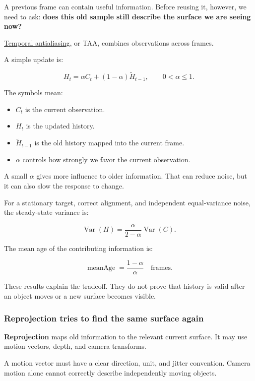 A previous frame can contain useful information. Before reusing it, however, we need to ask: \textbf{does this old sample still describe the surface we are seeing now?}

\hyperref[appendix-0727340a4428]{Temporal antialiasing}, or TAA, combines observations across frames.

A simple update is:

\[
H_t=\alpha C_t+(1-\alpha)\widetilde H_{t-1},
\qquad 0<\alpha\leq1.
\]

The symbols mean:

\begin{itemize}
\tightlist
\item
  \(C_t\) is the current observation.
\item
  \(H_t\) is the updated history.
\item
  \(\widetilde H_{t-1}\) is the old history mapped into the current frame.
\item
  \(\alpha\) controls how strongly we favor the current observation.
\end{itemize}

A small \(\alpha\) gives more influence to older information. That can reduce noise, but it can also slow the response to change.

For a stationary target, correct alignment, and independent equal-variance noise, the steady-state variance is:

\[
\operatorname{Var}(H)
=\frac{\alpha}{2-\alpha}\operatorname{Var}(C).
\]

The mean age of the contributing information is:

\[
\operatorname{meanAge}=\frac{1-\alpha}{\alpha}
\quad\text{frames}.
\]

These results explain the tradeoff. They do not prove that history is valid after an object moves or a new surface becomes visible.

\subsubsection{Reprojection tries to find the same surface again}\label{04-visual-computing-ii-ch043-reprojection-tries-to-find-the-same-surface-again}

\textbf{Reprojection} maps old information to the relevant current surface. It may use motion vectors, depth, and camera transforms.

A motion vector must have a clear direction, unit, and jitter convention. Camera motion alone cannot correctly describe independently moving objects.

